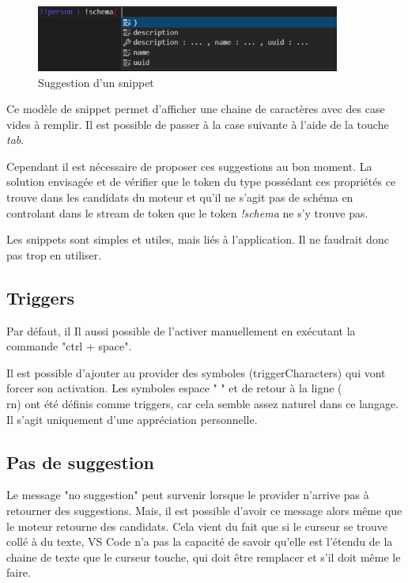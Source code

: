 \documentclass[
    iict, %
    il, %
]{heig-tb}
\begin{document}
\begin{figure}[!h]
    \begin{center}
        \includegraphics[width=10cm]{assets/figures/snippet-suggestion.png}
    \end{center}
    \caption[Suggestion d'un snippet]{\label{snippet-suggestion} Suggestion d'un snippet}
\end{figure}

Ce modèle de snippet permet d'afficher une chaine de caractères avec des case vides à remplir.
Il est possible de passer à la case suivante à l'aide de la touche \emph{tab}.

Cependant il est nécessaire de proposer ces suggestions au bon moment. La solution envisagée et de vérifier que le token du type possédant
ces propriétés ce trouve dans les candidats du moteur et qu'il ne s'agit pas de schéma en controlant dans le stream de token que le token \emph{!schema} ne s'y trouve pas.

Les snippets sont simples et utiles, mais liés à l'application. Il ne faudrait donc pas trop en utiliser.

\subsection{Triggers}
Par défaut, il Il aussi possible de l'activer manuellement en exécutant la commande "ctrl + space".

Il est possible d'ajouter au provider des symboles (triggerCharacters) qui vont forcer son activation. Les symboles espace " " et de retour à la ligne (\\rn) ont été définis comme triggers, car cela semble assez naturel dans ce langage.
Il s'agit uniquement d'une appréciation personnelle.

\subsection{Pas de suggestion}

Le message "no suggestion" peut survenir lorsque le provider n'arrive pas à retourner des suggestions.
Mais, il est possible d'avoir ce message alors même que le moteur retourne des candidats. Cela vient du fait
que si le curseur se trouve collé à du texte, VS Code n'a pas la capacité de savoir qu'elle est l'étendu de la chaine de texte que le curseur touche,
qui doit être remplacer et s'il doit même le faire.
\end{document}
